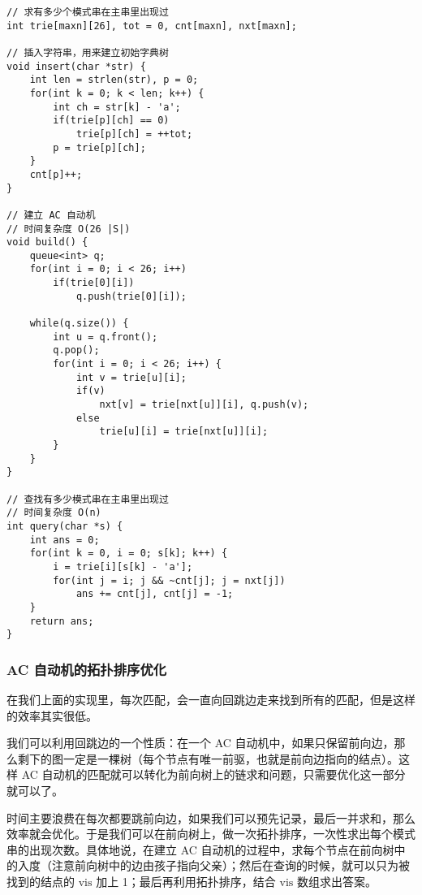 \documentclass[UTF8]{article}
\begin{document}
\begin{lstlisting}[caption=AC 自动机]
// 求有多少个模式串在主串里出现过
int trie[maxn][26], tot = 0, cnt[maxn], nxt[maxn];

// 插入字符串，用来建立初始字典树
void insert(char *str) {
	int len = strlen(str), p = 0;
	for(int k = 0; k < len; k++) {
		int ch = str[k] - 'a';
		if(trie[p][ch] == 0)
			trie[p][ch] = ++tot;
		p = trie[p][ch];
	}
	cnt[p]++;
}

// 建立 AC 自动机
// 时间复杂度 O(26 |S|)
void build() {
    queue<int> q;
    for(int i = 0; i < 26; i++)
        if(trie[0][i])
            q.push(trie[0][i]);
    
    while(q.size()) {
        int u = q.front();
        q.pop();
        for(int i = 0; i < 26; i++) {
            int v = trie[u][i];
            if(v)
                nxt[v] = trie[nxt[u]][i], q.push(v);
            else
                trie[u][i] = trie[nxt[u]][i];
        }
    }
}

// 查找有多少模式串在主串里出现过
// 时间复杂度 O(n)
int query(char *s) {
    int ans = 0;
    for(int k = 0, i = 0; s[k]; k++) {
        i = trie[i][s[k] - 'a'];
        for(int j = i; j && ~cnt[j]; j = nxt[j])
            ans += cnt[j], cnt[j] = -1;
    }
    return ans;
}
\end{lstlisting}



\subsubsection{AC 自动机的拓扑排序优化}
在我们上面的实现里，每次匹配，会一直向回跳边走来找到所有的匹配，但是这样的效率其实很低。

我们可以利用回跳边的一个性质：在一个 AC 自动机中，如果只保留前向边，那么剩下的图一定是一棵树（每个节点有唯一前驱，也就是前向边指向的结点）。这样 AC 自动机的匹配就可以转化为前向树上的链求和问题，只需要优化这一部分就可以了。

时间主要浪费在每次都要跳前向边，如果我们可以预先记录，最后一并求和，那么效率就会优化。于是我们可以在前向树上，做一次拓扑排序，一次性求出每个模式串的出现次数。具体地说，在建立 AC 自动机的过程中，求每个节点在前向树中的入度（注意前向树中的边由孩子指向父亲）；然后在查询的时候，就可以只为被找到的结点的 $\mathrm{vis}$ 加上 1；最后再利用拓扑排序，结合 $\mathrm{vis}$ 数组求出答案。
\end{document}
